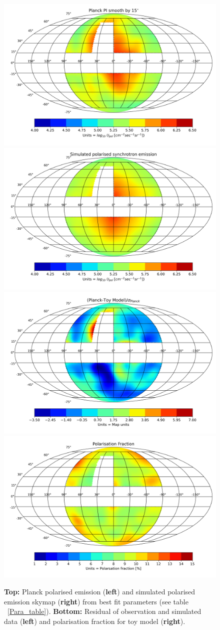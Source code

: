 \documentclass[usenatbib]{mnras}
\begin{document}
\begin{figure}
\centering
\includegraphics[width =0.49\linewidth]{Images/Feb-01-2022_Planck_Sky_Map.png}%
\includegraphics[width=0.49\linewidth]{Images/Feb-01-2022Ver1_Skymap_Bstr_3_Btur_6_Rmag_5_Zmag_7_norm_3.76e-13.png}
\includegraphics[width = 0.49\linewidth]{Images/Feb-01-2022_Residue_Bstr_3_Btur_6_Rmag_5_Zmag_7_norm_3.76e-13.png}%
\includegraphics[width =0.49\linewidth]{Images/Feb-01-2022_Pol_Frac_30GHz_Total_Skymap_Bstr_3_Btur_6_Rmag_5_Zmag_7_norm_2.61e-14.png}
\caption{\textbf{Top:} Planck polarised emission (\textbf{left}) and simulated polarised emission skymap (\textbf{right}) from best fit parameters (see table ~\ref{Para_table}). \textbf{Bottom:} Residual of observation and simulated data (\textbf{left}) and polarisation fraction for toy model (\textbf{right}).}
\label{fig:Skymaps}
\end{figure}
\end{document}
